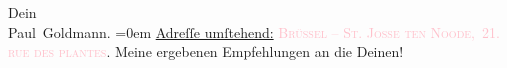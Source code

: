            \pstart
           Dein {\\[\baselineskip]}\spacefill\mbox{Paul Goldmann.}\pend
           \leftskip=0em{}\pstart
           \noindent{}\uline{Adreſſe umſtehend:}\pend
           \pstart
           {\pb}\textsc{\textcolor{pink}{Brüssel – St. Josse ten Noode, 21. rue des
                        plantes}{}\ledrightnote{\textcolor{pink}{rue des Plantes}}}.\pend
           \pstart
           Meine ergebenen Empfehlungen an die Deinen!\pend
           \endnumbering{}  
      
